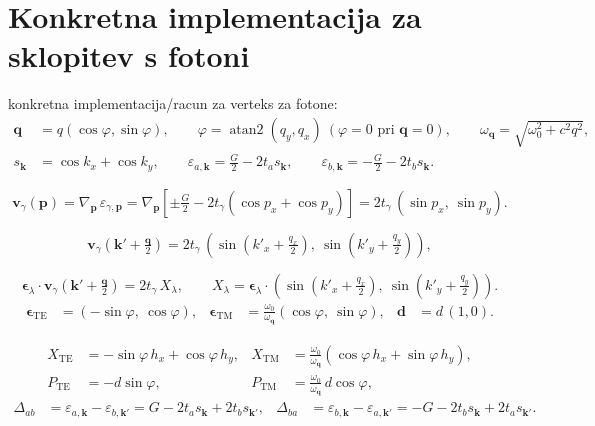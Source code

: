 \documentclass[a4paper,10pt]{article}
\begin{document}
\section{Konkretna implementacija za sklopitev s fotoni}
konkretna implementacija/racun za verteks za fotone: 
\begin{align}
\mathbf{q} &= q(\cos\varphi,\sin\varphi), \qquad
\varphi = \operatorname{atan2}(q_y,q_x)\ (\varphi=0\,\, \text{pri}\,\, \mathbf{q}=0), \qquad
\omega_{\mathbf{q}} = \sqrt{\omega_0^2 + c^2 q^2},\\
s_{\mathbf{k}} &= \cos k_x + \cos k_y, \qquad
\varepsilon_{a,\mathbf{k}} = \tfrac{G}{2} - 2t_a s_{\mathbf{k}}, \qquad
\varepsilon_{b,\mathbf{k}} = -\tfrac{G}{2} - 2t_b s_{\mathbf{k}} .
\end{align}

\begin{equation}
\mathbf{v}_{\gamma}(\mathbf{p}) = \nabla_{\mathbf{p}}\,\varepsilon_{\gamma,\mathbf{p}}
= \nabla_{\mathbf{p}}\left[\pm\tfrac{G}{2} - 2t_\gamma(\cos p_x + \cos p_y)\right]
= 2t_\gamma\,(\sin p_x,\ \sin p_y) .
\end{equation}

\begin{equation}
\mathbf{v}_{\gamma}\!\left(\mathbf{k}'+\tfrac{\mathbf{q}}{2}\right) = 2t_\gamma\,(\sin\!\left(k'_x + \tfrac{q_x}{2}\right),\ \sin\!\left(k'_y + \tfrac{q_y}{2}\right)),
\end{equation}

\begin{equation}
\boldsymbol{\epsilon}_{\lambda}\cdot\mathbf{v}_{\gamma}\!\left(\mathbf{k}'+\tfrac{\mathbf{q}}{2}\right)
= 2t_\gamma\,X_\lambda, \qquad
X_\lambda = \boldsymbol{\epsilon}_{\lambda}\cdot(\sin\!\left(k'_x + \tfrac{q_x}{2}\right),\ \sin\!\left(k'_y + \tfrac{q_y}{2}\right)) .
\end{equation}
\begin{align}
\boldsymbol{\epsilon}_{\mathrm{TE}} &= (-\sin\varphi,\ \cos\varphi), &
\boldsymbol{\epsilon}_{\mathrm{TM}} &= \frac{\omega_0}{\omega_{\mathbf{q}}}(\cos\varphi,\ \sin\varphi), &
\mathbf{d} &= d\,(1,0).
\end{align}

\begin{align}
X_{\mathrm{TE}} &= -\sin\varphi\, h_x + \cos\varphi\, h_y, &
X_{\mathrm{TM}} &= \frac{\omega_0}{\omega_{\mathbf{q}}}\left(\cos\varphi\, h_x + \sin\varphi\, h_y\right),\\
P_{\mathrm{TE}} &= -d\sin\varphi, &
P_{\mathrm{TM}} &= \frac{\omega_0}{\omega_{\mathbf{q}}}\, d\cos\varphi,
\end{align}
\begin{align}
\Delta_{ab} &= \varepsilon_{a,\mathbf{k}} - \varepsilon_{b,\mathbf{k}'} = G - 2t_a s_{\mathbf{k}} + 2t_b s_{\mathbf{k}'}, &
\Delta_{ba} &= \varepsilon_{b,\mathbf{k}} - \varepsilon_{a,\mathbf{k}'} = -G - 2t_b s_{\mathbf{k}} + 2t_a s_{\mathbf{k}'} .
\end{align}
\end{document}
